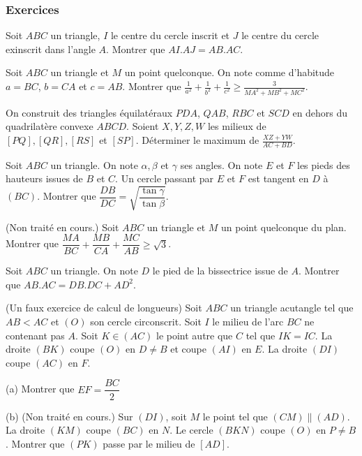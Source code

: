 
\subsubsection{Exercices}
\begin{exo}
Soit $ABC$ un triangle, $I$ le centre du cercle inscrit et $J$ le centre du cercle exinscrit dans l'angle $A$. Montrer que $AI.AJ=AB.AC$.
\end{exo}

\begin{exo}
 Soit $ABC$ un triangle et $M$ un point quelconque. On note comme d'habitude $a=BC$, $b=CA$ et $c=AB$. Montrer que $\frac{1}{a^2}+\frac{1}{b^2}+\frac{1}{c^2}\geqslant \frac{3}{MA^2+MB^2+MC^2}$.
\end{exo}

\begin{exo}
 On construit des triangles \'equilat\'eraux $PDA$, $QAB$, $RBC$ et $SCD$ en dehors du quadrilat\`ere convexe $ABCD$. Soient $X,Y,Z,W$ les
milieux de $[PQ],[QR],[RS]$ et $[SP]$. D\'eterminer le maximum de $\frac{XZ+YW}{AC+BD}$. 
\end{exo}

\begin{exo} 
 Soit $ABC$ un triangle. On note $\alpha,\beta$ et $\gamma$ ses angles.
On note $E$ et $F$ les pieds des hauteurs issues de $B$ et $C$. Un cercle passant par $E$ et $F$ est tangent en $D$ \`a $(BC)$.
Montrer que $\dfrac{DB}{DC}=\sqrt{\dfrac{\tan\gamma}{\tan\beta}}$.
\end{exo}

\begin{exo}
(Non trait\'e en cours.)
 Soit $ABC$ un triangle et $M$ un point quelconque du plan. Montrer que $\dfrac{MA}{BC}+\dfrac{MB}{CA}+\dfrac{MC}{AB}\geqslant\sqrt{3}$.
\end{exo}

\begin{exo}
 Soit $ABC$ un triangle. On note $D$ le pied de la bissectrice issue de $A$. Montrer que $AB.AC=DB.DC+AD^2$.
\end{exo}

\begin{exo}
 (Un faux exercice de calcul de longueurs)
Soit $ABC$ un triangle acutangle tel que $AB<AC$ et $(O)$ son cercle circonscrit. Soit $I$ le milieu de l'arc $BC$ ne contenant pas $A$. Soit
$K\in (AC)$ le point autre que $C$ tel que $IK=IC$. La droite $(BK)$ coupe $(O)$ en $D\ne B$ et coupe $(AI)$ en $E$. La droite $(DI)$ coupe $(AC)$ en $F$.

(a) Montrer que $EF=\dfrac{BC}{2}$

(b) (Non trait\'e en cours.) Sur $(DI)$, soit $M$ le point tel que $(CM)\parallel (AD)$. La droite $(KM)$ coupe $(BC)$ en $N$. Le cercle $(BKN)$ coupe $(O)$ en $P\ne B$. Montrer que $(PK)$ passe par le milieu de $[AD]$.
\end{exo}


